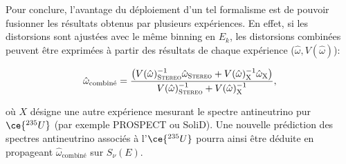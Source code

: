 %
%
%
%
%
%
%

Pour conclure, l'avantage du déploiement d'un tel formalisme est de pouvoir fusionner les résultats obtenus par plusieurs expériences. En effet, si les distorsions sont ajustées avec le même binning en $E_k$, les distorsions combinées peuvent être exprimées à partir des résultats de chaque expérience ($\hat{\omega}, V(\hat{\omega})$):

\begin{equation}
    \hat{\omega}_\textrm{combiné} = \frac{\left( V(\hat{\omega})^{-1}_\textsc{Stereo} \hat{\omega}_\textsc{Stereo} + V(\hat{\omega})^{-1}_\textsc{X} \hat{\omega}_\textsc{X} \right)}{V(\hat{\omega})^{-1}_\textsc{Stereo} + V(\hat{\omega})^{-1}_\textsc{X}},
\end{equation}

\bigbreak

où $X$ désigne une autre expérience mesurant le spectre antineutrino pur $\ce{^{235}U}$ (par exemple PROSPECT ou SoliD). Une nouvelle prédiction des spectres antineutrino associés à l'$\ce{^{235}U}$ pourra ainsi être déduite en propageant $\hat{\omega}_\textrm{combiné}$ sur $S_\nu(E)$.

\bigbreak

